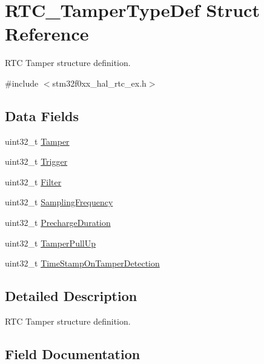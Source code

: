 \hypertarget{struct_r_t_c___tamper_type_def}{}\section{R\+T\+C\+\_\+\+Tamper\+Type\+Def Struct Reference}
\label{struct_r_t_c___tamper_type_def}


R\+TC Tamper structure definition.  




{\ttfamily \#include $<$stm32f0xx\+\_\+hal\+\_\+rtc\+\_\+ex.\+h$>$}

\subsection*{Data Fields}
\begin{DoxyCompactItemize}
\item 
uint32\+\_\+t \hyperlink{struct_r_t_c___tamper_type_def_a171f3c1ad5ac278d7d5bde4f40e0728b}{Tamper}
\item 
uint32\+\_\+t \hyperlink{struct_r_t_c___tamper_type_def_a73dd50a4d440463bf9e1cb02b72ac706}{Trigger}
\item 
uint32\+\_\+t \hyperlink{struct_r_t_c___tamper_type_def_aedf8a9093e5cb06013bfdb5f63613bc8}{Filter}
\item 
uint32\+\_\+t \hyperlink{struct_r_t_c___tamper_type_def_a632dccc8dfc8dd442591ca34a95cc69d}{Sampling\+Frequency}
\item 
uint32\+\_\+t \hyperlink{struct_r_t_c___tamper_type_def_a6fbac45841d9d2d878199a440449a416}{Precharge\+Duration}
\item 
uint32\+\_\+t \hyperlink{struct_r_t_c___tamper_type_def_a720d93fc9b3e57ec856279517a7e4203}{Tamper\+Pull\+Up}
\item 
uint32\+\_\+t \hyperlink{struct_r_t_c___tamper_type_def_ab0792219a611eb765a873285ac621f9a}{Time\+Stamp\+On\+Tamper\+Detection}
\end{DoxyCompactItemize}


\subsection{Detailed Description}
R\+TC Tamper structure definition. 

\subsection{Field Documentation}
\mbox{\label{struct_r_t_c___tamper_type_def_aedf8a9093e5cb06013bfdb5f63613bc8}} 
